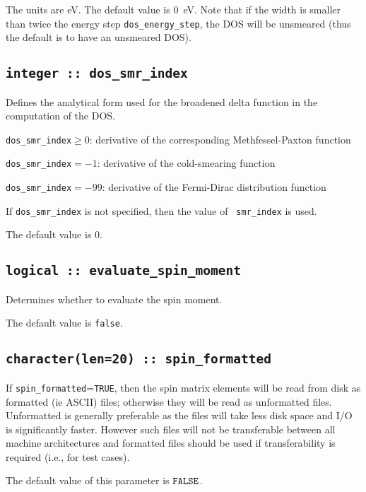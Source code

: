 The units are eV. The default value is 0~eV. Note that if the width is
smaller than twice the energy step {\tt dos\_energy\_step}, the DOS
will be unsmeared (thus the default is to have an unsmeared DOS).


\subsection[dos\_smr\_en\_width]{\tt integer :: dos\_smr\_index}

Defines the analytical form used for the broadened delta function in the computation of the DOS.

\hspace{0.5cm}
{\tt dos\_smr\_index}$\geq 0$: derivative of the corresponding Methfessel-Paxton function

\hspace{0.5cm}
{\tt dos\_smr\_index}$= -1$: derivative of the cold-smearing function

\hspace{0.5cm}
{\tt dos\_smr\_index}$= -99$: derivative of the Fermi-Dirac distribution function

If {\tt dos\_smr\_index} is not specified, then the value of {\tt
  smr\_index} is used.  

The default value is 0.

\subsection[evaluate\_spin\_moment]{\tt logical :: evaluate\_spin\_moment}
Determines whether to evaluate the spin moment.

The default value is \verb#false#.

\subsection[spin\_formated]{\tt character(len=20) :: spin\_formatted}

If \verb#spin_formatted#=\verb#TRUE#, then the spin matrix elements will be
read from disk as formatted (ie ASCII) files; otherwise they will be
read as unformatted files. Unformatted is generally preferable as the
files will take less disk space and I/O is significantly
faster. However such files will not be transferable between all
machine architectures and formatted files should be used if
transferability is required (i.e., for test cases).

The default value of this parameter is $\verb#FALSE#$.


